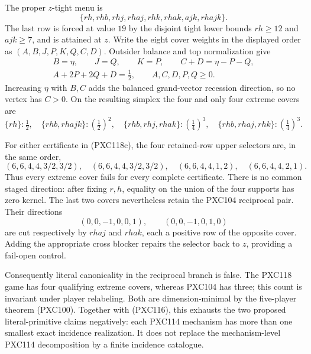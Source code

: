 \documentclass[11pt]{article}
\begin{document}
The proper \(z\)-tight menu is
\[
 \{rh,rhb,rhj,rhaj,rhk,rhak,ajk,rhajk\}.
\]
The last row is forced at value \(19\) by the disjoint tight lower bounds
\(rh\ge12\) and \(ajk\ge7\), and is attained at \(z\).  Write the eight
cover weights in the displayed order as
\((A,B,J,P,K,Q,C,D)\).  Outsider balance and top normalization give
\begin{equation}
\begin{gathered}
 B=\eta,\qquad J=Q,\qquad K=P,\qquad
 C+D=\eta-P-Q,\\
 A+2P+2Q+D=\tfrac12,\qquad
 A,C,D,P,Q\ge0.                                             \tag{PXC118d}
\end{gathered}
\end{equation}
Increasing \(\eta\) with \(B,C\) adds the balanced grand-vector recession
direction, so no vertex has \(C>0\).  On the resulting simplex the four and
only four extreme covers are
\begin{equation}
 \{rh\}:\tfrac12,\quad
 \{rhb,rhajk\}:\left(\tfrac12\right)^2,\quad
 \{rhb,rhj,rhak\}:\left(\tfrac14\right)^3,\quad
 \{rhb,rhaj,rhk\}:\left(\tfrac14\right)^3.                 \tag{PXC118e}
\end{equation}

For either certificate in (PXC118c), the four retained-row upper selectors
are, in the same order,
\begin{equation}
 (6,6,4,4,3/2,3/2),\quad
 (6,6,4,4,3/2,3/2),\quad
 (6,6,4,4,1,2),\quad
 (6,6,4,4,2,1).                                             \tag{PXC118f}
\end{equation}
Thus every extreme cover fails for every complete certificate.  There is no
common staged direction: after fixing \(r,h\), equality on the union of the
four supports has zero kernel.  The last two covers nevertheless retain the
PXC104 reciprocal pair.  Their directions
\[
 (0,0,-1,0,0,1),\qquad (0,0,-1,0,1,0)
\]
are cut respectively by \(rhaj\) and \(rhak\), each a positive row of the
opposite cover.  Adding the appropriate cross blocker repairs the selector
back to \(z\), providing a fail-open control.

Consequently literal canonicality in the reciprocal branch is false.  The
PXC118 game has four qualifying extreme covers, whereas PXC104 has three;
this count is invariant under player relabeling.  Both are dimension-minimal
by the five-player theorem (PXC100).  Together with (PXC116), this exhausts
the two proposed literal-primitive claims negatively: each PXC114 mechanism
has more than one smallest exact incidence realization.  It does not replace
the mechanism-level PXC114 decomposition by a finite incidence catalogue.
\end{document}
